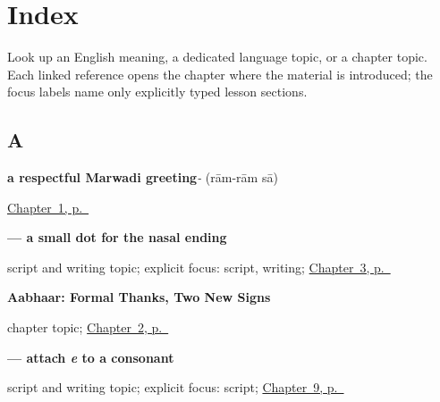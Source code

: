 
\chapter*{Index}

Look up an English meaning, a dedicated language topic, or a chapter topic. Each linked reference opens the chapter where the material is introduced; the focus labels name only explicitly typed lesson sections.

\section*{A}

\noindent\begin{minipage}[t]{\linewidth}
\raggedright
\textbf{a respectful Marwadi greeting}\enspace\emph{- }\enspace(rām-rām sā)\par
\footnotesize \hyperref[ch:mw-ram-ram-sa]{Chapter~1, p.~\pageref*{ch:mw-ram-ram-sa}}
\end{minipage}\par\smallskip

\noindent\begin{minipage}[t]{\linewidth}
\raggedright
\textbf{ — a small dot for the nasal ending}\par
\footnotesize script and writing topic; explicit focus: script, writing; \hyperref[ch:mw-haan-saa]{Chapter~3, p.~\pageref*{ch:mw-haan-saa}}
\end{minipage}\par\smallskip

\noindent\begin{minipage}[t]{\linewidth}
\raggedright
\textbf{Aabhaar: Formal Thanks, Two New Signs}\par
\footnotesize chapter topic; \hyperref[ch:mw-aabhaar]{Chapter~2, p.~\pageref*{ch:mw-aabhaar}}
\end{minipage}\par\smallskip

\noindent\begin{minipage}[t]{\linewidth}
\raggedright
\textbf{ — attach \emph{e} to a consonant}\par
\footnotesize script and writing topic; explicit focus: script; \hyperref[ch:mw-see-you-later]{Chapter~9, p.~\pageref*{ch:mw-see-you-later}}
\end{minipage}\par\smallskip

